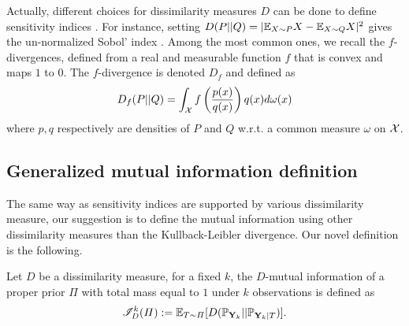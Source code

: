 Actually, different choices for dissimilarity measures $D$ can be done to define sensitivity indices \citep{da_veiga_global_2015}. For instance, setting $D(P||Q)=|\mathbb{E}_{X\sim P}X-\mathbb{E}_{X\sim Q}X|^2$ gives the un-normalized Sobol’ index \citep{sobol_sensitivity_1993}.
Among the most common ones, we recall the $f$-divergences, defined from a real and measurable function $f$ that is convex and maps $1$ to $0$. The $f$-divergence is denoted $D_f$ and defined as 
    \begin{equation}
        D_f(P||Q) = \int_{\mathcal{X}} f\left(\frac{p(x)}{q(x)}\right) q(x) d\omega(x)
    \end{equation}
where $p,q$ respectively are densities of $P$ and $Q$  w.r.t. a common measure $\omega$ on $\mathcal{X}$.







\subsection{Generalized mutual information definition}


The same way as sensitivity indices are supported by various dissimilarity measure, our suggestion is to define the mutual information using other dissimilarity measures than the Kullback-Leibler divergence.
Our novel definition is the following.
\begin{defi}
    Let $D$ be a dissimilarity measure, for a fixed $k$, the $D$-mutual information of a proper prior $\varPi$ with total mass equal to $1$ under $k$ observations is defined as
        \begin{equation}
            \mathscr{I}_D^k(\varPi) := \mathbb{E}_{T\sim\varPi}[D(\mathbb{P}_{\mathbf{Y}_k}||\mathbb{P}_{\mathbf{Y}_k|T} )].
        \end{equation}
\end{defi}

